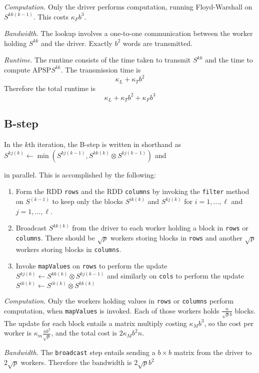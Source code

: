 \documentclass{article} %
\begin{document}
\emph{Computation.} Only the driver performs computation, running
Floyd-Warshall on $S^{kk(k-1)}$.  This costs $\kappa_F b^3$.

\emph{Bandwidth.}
The lookup involves a one-to-one communication between the worker holding $S^{kk}$ and the driver.
Exactly $b^2$ words are transmitted.

\emph{Runtime.}
The runtime consists of the time taken to transmit $S^{kk}$ and the time to compute $\text{APSP}S^{kk}$.
The transmission time is
\[
\kappa_L + \kappa_T b^2
\]
Therefore the total runtime is
\[
\kappa_L + \kappa_T b^2 + \kappa_F b^3
\]

\subsection{B-step}
In the $k$th iteration, the B-step is written in shorthand as
 $S^{kj(k)} \leftarrow \min(S^{kj(k-1)}, S^{kk(k)} \otimes S^{kj(k-1)})$ 
and 

 in parallel.
This is accomplished by the following:
\begin{enumerate}
\item Form the RDD {\tt rows} and the RDD {\tt columns} by invoking
  the {\tt filter} method on $S^{(k-1)}$ to keep only the blocks
  $S^{ik(k)}$ and $S^{kj(k)}$ for $i = 1,\hdots, \ell$ and $j =
  1,\hdots, \ell$.
\item Broadcast $S^{kk(k)}$ from the driver to each worker holding a
  block in {\tt rows} or {\tt columns}.  There should be $\sqrt{p}$
  workers storing blocks in {\tt rows} and another $\sqrt{p}$ workers
  storing blocks in {\tt columns}.
\item Invoke {\tt mapValues} on {\tt rows} to perform the update
  $S^{kj(k)} \leftarrow S^{kk(k)} \otimes S^{kj(k-1)}$ and similarly
  on {\tt cols} to perform the update $S^{ik(k)} \leftarrow S^{ik(k)}
  \otimes S^{kk(k)}$
\end{enumerate}

\emph{Computation.}  Only the workers holding values in {\tt rows} or
     {\tt columns} perform computation, when {\tt mapValues} is
     invoked.  Each of those workers holds $\frac{n}{\sqrt{p}b}$
     blocks.  The update for each block entails a matrix multiply
     costing $\kappa_M b^3$, so the cost per worker is $\kappa_m
     \frac{nb^2}{\sqrt{p}}$, and the total cost is $2\kappa_M b^2 n$.

\emph{Bandwidth.} The {\tt broadcast} step entails sending a $b \times
b$ matrix from the driver to $2\sqrt{p}$ workers.  Therefore the
bandwidth is $2\sqrt{p}b^2$
\end{document}
